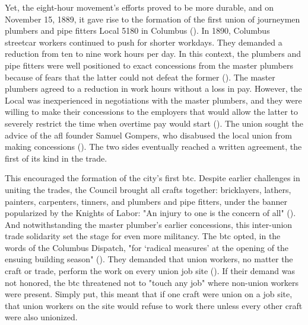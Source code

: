 \documentclass[12pt]{article}
\begin{document}
Yet, the eight-hour movement’s efforts proved to be more durable, and on November 15, 1889, it gave rise to the formation of the first union of journeymen plumbers and pipe fitters Local 5180 in Columbus (\cite[45]{schneirovPrideSolidarityHistory1993}). In 1890, Columbus streetcar workers continued to push for shorter workdays. They demanded a reduction from ten to nine work hours per day. In this context, the plumbers and pipe fitters were well positioned to exact concessions from the master plumbers because of fears that the latter could not defeat the former (\citeyear[45–46]{schneirovPrideSolidarityHistory1993}). The master plumbers agreed to a reduction in work hours without a loss in pay. However, the Local was inexperienced in negotiations with the master plumbers, and they were willing to make their concessions to the employers that would allow the latter to severely restrict the time when overtime pay would start (\citeyear[46–47]{schneirovPrideSolidarityHistory1993}). The union sought the advice of the \acrshort{afl} founder Samuel Gompers, who disabused the local union from making concessions (\citeyear[46–47]{schneirovPrideSolidarityHistory1993}). The two sides eventually reached a written agreement, the first of its kind in the trade. 

This encouraged the formation of the city’s first \acrfull{btc}. Despite earlier challenges in uniting the trades, the Council brought all crafts together: bricklayers, lathers, painters, carpenters, tinners, and plumbers and pipe fitters, under the banner popularized by the Knights of Labor: "An injury to one is the concern of all" (\cite[47]{schneirovPrideSolidarityHistory1993}). And notwithstanding the master plumber’s earlier concessions, this inter-union trade solidarity set the stage for even more militancy. The \acrshort{btc} opted, in the words of the Columbus Dispatch, "for ‘radical measures’ at the opening of the ensuing building season" (\citeyear[47]{schneirovPrideSolidarityHistory1993}). They demanded that union workers, no matter the craft or trade, perform the work on every union job site (\citeyear[47]{schneirovPrideSolidarityHistory1993}). If their demand was not honored, the \acrshort{btc} threatened not to "touch any job" where non-union workers were present. Simply put, this meant that if one craft were union on a job site, that union workers on the site would refuse to work there unless every other craft were also unionized.
\end{document}
